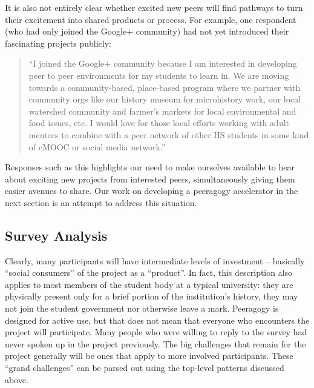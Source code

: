 \documentclass{acm_proc_article-sp}
\begin{document}
It is also not entirely clear whether excited new peers will find pathways to turn their excitement into shared products or process. For example, one respondent (who had only joined the Google+ community) had not yet introduced their fascinating projects publicly:

\begin{quote}
``I joined the Google+ community because I am interested in developing peer to peer environments for my students to learn in. We are moving towards a community-based, place-based program where we partner with community orgs like our history museum for microhistory work, our local watershed community and farmer's markets for local environmental and food issues, etc. I would love for those local efforts working with adult mentors to combine with a peer network of other HS students in some kind of cMOOC or social media network.''
\end{quote}

Responses such as this highlights our need to make ourselves available to hear about exciting new projects from interested peers, simultaneously giving them easier avenues to share. Our work on developing a peeragogy accelerator in the next section is an attempt to address this situation.

\subsection{Survey Analysis} \label{survey-analysis}

Clearly, many participants will have intermediate levels of investment -- basically ``social consumers'' of the project as a ``product''. In fact, this description also applies to most members of the student body at a typical university: they are physically present only for a brief portion of the institution's history, they may not join the student government nor otherwise leave a mark. Peeragogy is designed for active use, but that does not mean that everyone who encounters the project will participate. Many people who were willing to reply to the survey had never spoken up in the project previously. The big challenges that remain for the project generally will be ones that apply to more involved participants. These ``grand challenges'' can be parsed out using the top-level patterns discussed above.
\end{document}
